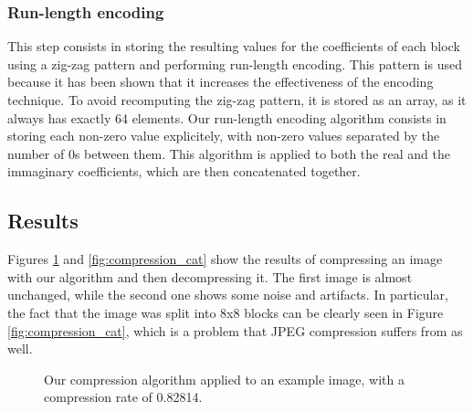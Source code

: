 \subsubsection{Run-length encoding}
This step consists in storing the resulting values for the coefficients of each block using a zig-zag pattern and performing run-length encoding. This pattern is used because it has been shown that it increases the effectiveness of the encoding technique. To avoid recomputing the zig-zag pattern, it is stored as an array, as it always has exactly 64 elements. Our run-length encoding algorithm consists in storing each non-zero value explicitely, with non-zero values separated by the number of 0s between them. This algorithm is applied to both the real and the immaginary coefficients, which are then concatenated together.

\subsection{Results}
Figures \ref{fig:compression_road} and \ref{fig:compression_cat} show the results of compressing an image with our algorithm and then decompressing it. The first image is almost unchanged, while the second one shows some noise and artifacts. In particular, the fact that the image was split into 8x8 blocks can be clearly seen in Figure \ref{fig:compression_cat}, which is a problem that JPEG compression suffers from as well. 

\begin{figure}[ht]
    \centering
    \caption{Our compression algorithm applied to an example image, with a compression rate of 0.82814.}
    \label{fig:compression_road}
\end{figure}

